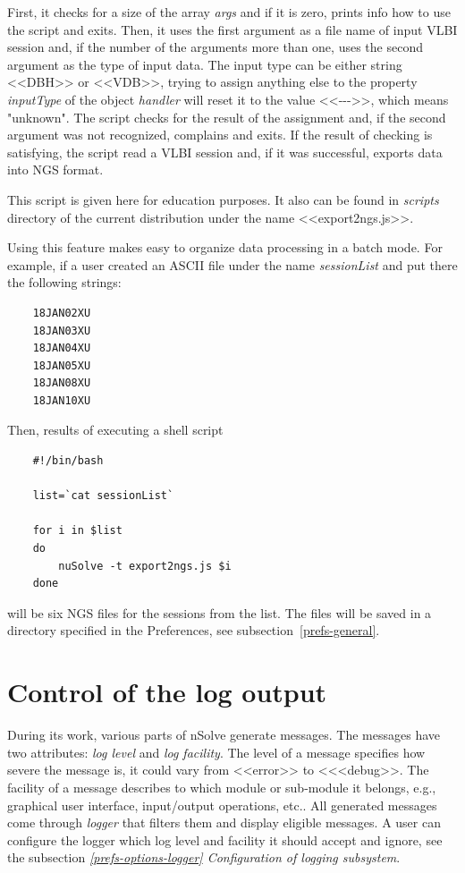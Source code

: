 \documentclass [10pt,letterpaper]{report}
\newcommand{\nuSolve}{\greektext n\latintext Solve}
\begin{document}
{{First, it checks for a size of the array {\sl args} and if it is zero, prints info
how to use the script and exits. Then, it uses the first argument as a file name of
input VLBI session and, if the number of the arguments more than one, uses the second
argument as the type of input data. The input type can be either string <<DBH>> or <<VDB>>,
trying to assign anything else to the property {\sl inputType} of the object {\sl handler}
will reset it to the value <<-{}-{}->>, which means "unknown". The script checks for
the result of the assignment and, if the second argument was not recognized, complains
and exits. If the result of checking is satisfying, the script read a VLBI session and,
if it was successful, exports data into NGS format.

This script is given here for education purposes. It also can be found in {\sl scripts}
directory of the current distribution under the name <<export2ngs.js>>.

Using this feature makes easy to organize data processing in a batch mode. For example,
if a user created an ASCII file under the name {\sl sessionList} and put there the
following strings:
\begin{verbatim}
    18JAN02XU
    18JAN03XU
    18JAN04XU
    18JAN05XU
    18JAN08XU
    18JAN10XU
\end{verbatim}
\noindent
Then, results of executing a shell script
\begin{verbatim}
    #!/bin/bash

    list=`cat sessionList`

    for i in $list
    do
        nuSolve -t export2ngs.js $i
    done
\end{verbatim}
\noindent
will be six NGS files for the sessions from the list. The files will be saved in a directory
specified in the Preferences, see subsection~\ref{prefs-general}.




\section{Control of the log output}
\label{section-scripting-logger}

During its work, various parts of \nuSolve{} generate messages. The messages have
two attributes: {\sl log level} and {\sl log facility}. The level of a message specifies
how severe the message is, it could vary from <<error>> to <<<debug>>. The facility of
a message describes to which module or sub-module it belongs, e.g., graphical user interface,
input/output operations, etc.. All generated messages come through {\sl logger} that filters
them and display eligible messages. A user can configure the logger which log level and
facility it should accept and ignore, see the subsection \emph{\ref{prefs-options-logger}
Configuration of logging subsystem}.

}}
\end{document}
